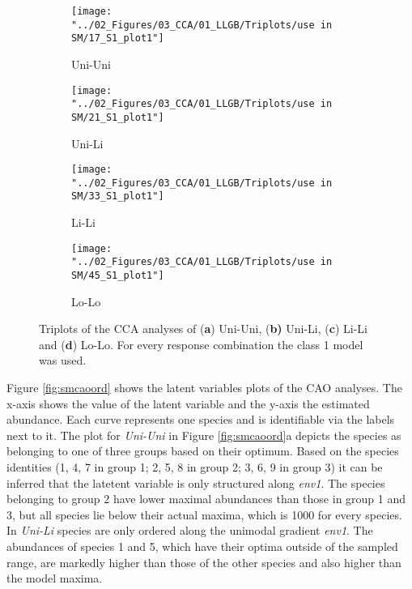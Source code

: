 		\begin{figure}[h]
			\begin{subfigure}{0.5\textwidth}		
				\centering
				\texttt{[image: "../02\_Figures/03\_CCA/01\_LLGB/Triplots/use in SM/17\_S1\_plot1"]}
				\caption{Uni-Uni}
			\end{subfigure}
			\begin{subfigure}{0.5\textwidth}
				\centering		
				\texttt{[image: "../02\_Figures/03\_CCA/01\_LLGB/Triplots/use in SM/21\_S1\_plot1"]}
				\caption{Uni-Li}
			\end{subfigure}
			\begin{subfigure}{0.5\textwidth}	
				\centering	
				\texttt{[image: "../02\_Figures/03\_CCA/01\_LLGB/Triplots/use in SM/33\_S1\_plot1"]}
				\caption{Li-Li}
			\end{subfigure}
			\begin{subfigure}{0.5\textwidth}		
				\centering
				\texttt{[image: "../02\_Figures/03\_CCA/01\_LLGB/Triplots/use in SM/45\_S1\_plot1"]}
				\caption{Lo-Lo}
			\end{subfigure}
			
			\caption{Triplots of the CCA analyses of (\textbf{a}) Uni-Uni, (\textbf{b)} Uni-Li, (\textbf{c}) Li-Li and (\textbf{d}) Lo-Lo. For every response combination the class 1 model was used.}
			\label{fig:smccaord}
		
		\end{figure}
		\newpage
		Figure \ref{fig:smcaoord} shows the latent variables plots of the CAO analyses. 
		The x-axis shows the value of the latent variable and the y-axis the estimated abundance.
		Each curve represents one species and is identifiable via the labels next to it.
		The plot for \textit{Uni-Uni} in Figure \ref{fig:smcaoord}a depicts the species as belonging to one of three groups based on their optimum.
		Based on the species identities (1, 4, 7 in group 1; 2, 5, 8 in group 2; 3, 6, 9 in group 3) it can be inferred that the latetent variable is only structured along \textit{env1}.
		The species belonging to group 2 have lower maximal abundances than those in group 1 and 3, but all species lie below their actual maxima, which is 1000 for every species.  
		In \textit{Uni-Li} species are only ordered along the unimodal gradient \textit{env1}.
		The abundances of species 1 and 5, which have their optima outside of the sampled range, are markedly higher than those of the other species and also higher than the model maxima.
